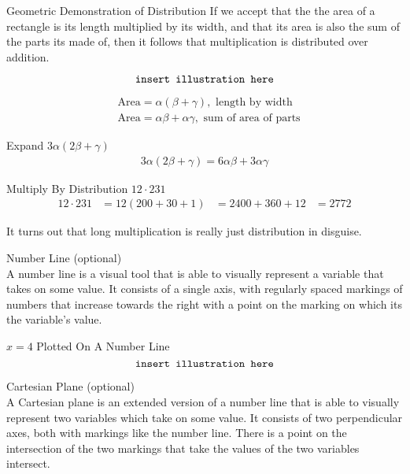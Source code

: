 \documentclass{book}
\begin{document}
  {\remark Geometric Demonstration of Distribution 
    If we accept that the the area of a rectangle is its length multiplied by its width, and that its area is also the sum of the parts its made of, then it follows that multiplication is distributed over addition.

    $$\text{\texttt{insert illustration here}}$$

    \begin{align*}
      & \text{Area} = \alpha (\beta + \gamma), \text{ length by width}\\
      & \text{Area} = \alpha \beta + \alpha \gamma, \text{ sum of area of parts}
    \end{align*}
  }

  {\example Expand $3 \alpha(2 \beta + \gamma)$ 
    \begin{align*}
      3 \alpha (2 \beta + \gamma) = 6 \alpha \beta + 3 \alpha \gamma
    \end{align*}
  }

  {\example Multiply By Distribution $12 \cdot 231$
    \begin{align*}
      12 \cdot 231 & = 12 (200 + 30 + 1)
      & = 2400 + 360 + 12
      & = 2772
    \end{align*}

    It turns out that long multiplication is really just distribution in disguise.\\
  }

  {\remark Number Line (optional) \\
    A number line is a visual tool that is able to visually represent a variable that takes on some value. It consists of a single axis, with regularly spaced markings of numbers that increase towards the right with a point on the marking on which its the variable's value.\\
  }

  {\example $x = 4$ Plotted On A Number Line\\
    $$\text{\texttt{insert illustration here}}$$
  }

  {\remark Cartesian Plane (optional) \\
    A Cartesian plane is an extended version of a number line that is able to visually represent two variables which take on some value. It consists of two perpendicular axes, both with markings like the number line. There is a point on the intersection of the two markings that take the values of the two variables intersect.\\
  }
\end{document}
